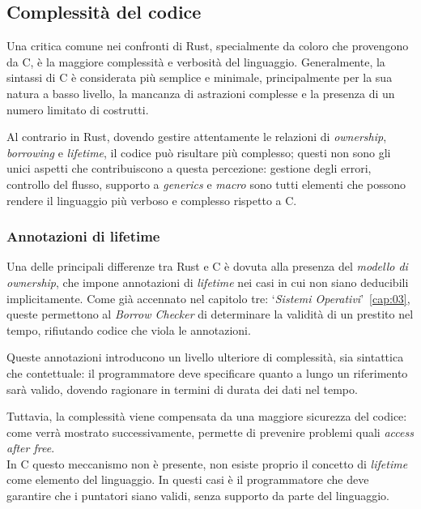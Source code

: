 \subsection{Complessità del codice}
Una critica comune nei confronti di Rust, specialmente da coloro che provengono da C, è la maggiore complessità e verbosità del linguaggio.
Generalmente, la sintassi di C è considerata più semplice e minimale, principalmente per la sua natura a basso livello, la mancanza di astrazioni
complesse e la presenza di un numero limitato di costrutti.

Al contrario in Rust, dovendo gestire attentamente le relazioni di \textit{ownership}, \textit{borrowing} e \textit{lifetime}, il codice può risultare più complesso; 
questi non sono gli unici aspetti che contribuiscono a questa percezione: gestione degli errori, controllo del flusso, supporto a \textit{generics} e \textit{macro} sono
tutti elementi che possono rendere il linguaggio più verboso e complesso rispetto a C.

\subsubsection{Annotazioni di lifetime}
Una delle principali differenze tra Rust e C è dovuta alla presenza del \textit{modello di ownership}, che impone annotazioni di \textit{lifetime} nei casi in cui non siano deducibili implicitamente.
Come già accennato nel capitolo tre: `\textit{Sistemi Operativi}'~\ref{cap:03}, queste permettono al \textit{Borrow Checker} di determinare la validità di un prestito nel tempo, rifiutando 
codice che viola le annotazioni.

Queste annotazioni introducono un livello ulteriore di complessità, sia sintattica che contettuale: il programmatore deve specificare quanto a lungo
un riferimento sarà valido, dovendo ragionare in termini di durata dei dati nel tempo.

Tuttavia, la complessità viene compensata da una maggiore sicurezza del codice: come verrà mostrato successivamente, permette di prevenire
problemi quali \textit{access after free}. \hfill
\vspace{10pt} \\
\noindent In C questo meccanismo non è presente, non esiste proprio il concetto di \textit{lifetime} come elemento del linguaggio. In questi
casi è il programmatore che deve garantire che i puntatori siano validi, senza supporto da parte del linguaggio.

